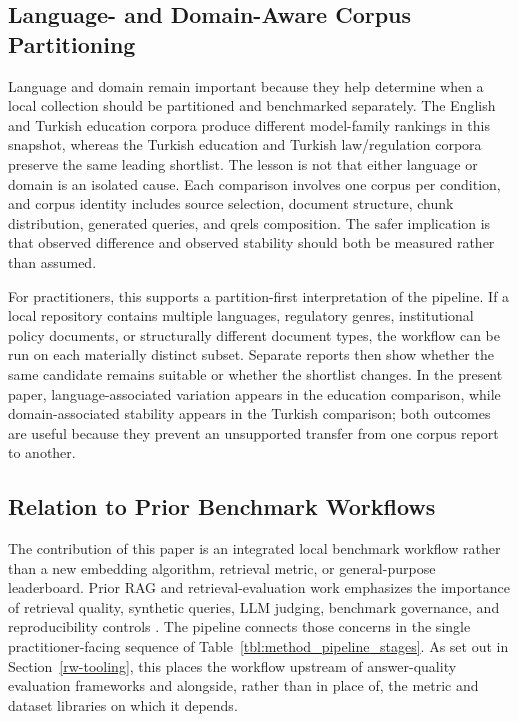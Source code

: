 \subsection{Language- and Domain-Aware Corpus Partitioning}\label{discussion-language-domain-partitioning}

Language and domain remain important because they help determine when a local collection should be partitioned and benchmarked separately. The English and Turkish education corpora produce different model-family rankings in this snapshot, whereas the Turkish education and Turkish law/regulation corpora preserve the same leading shortlist. The lesson is not that either language or domain is an isolated cause. Each comparison involves one corpus per condition, and corpus identity includes source selection, document structure, chunk distribution, generated queries, and qrels composition. The safer implication is that observed difference and observed stability should both be measured rather than assumed.

For practitioners, this supports a partition-first interpretation of the pipeline. If a local repository contains multiple languages, regulatory genres, institutional policy documents, or structurally different document types, the workflow can be run on each materially distinct subset. Separate reports then show whether the same candidate remains suitable or whether the shortlist changes. In the present paper, language-associated variation appears in the education comparison, while domain-associated stability appears in the Turkish comparison; both outcomes are useful because they prevent an unsupported transfer from one corpus report to another.

\subsection{Relation to Prior Benchmark Workflows}\label{discussion-prior-workflows}

The contribution of this paper is an integrated local benchmark workflow rather than a new embedding algorithm, retrieval metric, or general-purpose leaderboard. Prior RAG and retrieval-evaluation work emphasizes the importance of retrieval quality, synthetic queries, LLM judging, benchmark governance, and reproducibility controls \citep{Lewis_RAG_2021,Zhu_LLMIR_Survey_2025,thakur2025support,abdallah2025rerankarena,miyaji2025evaluating,wang2025reproducibility,friel2024ragbench}. The pipeline connects those concerns in the single practitioner-facing sequence of Table~\ref{tbl:method_pipeline_stages}. As set out in Section~\ref{rw-tooling}, this places the workflow upstream of answer-quality evaluation frameworks and alongside, rather than in place of, the metric and dataset libraries on which it depends.

